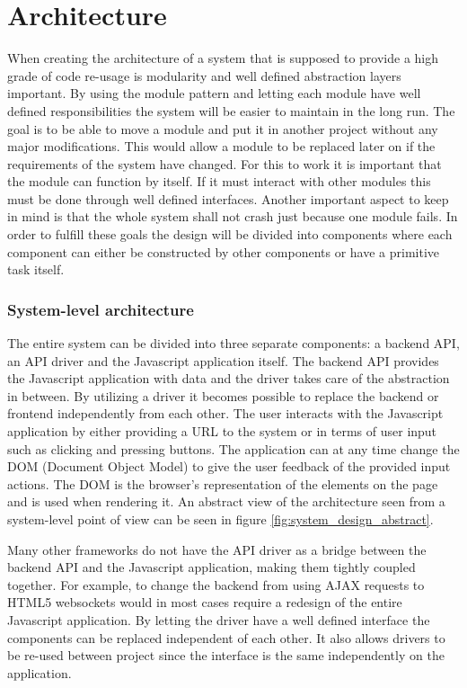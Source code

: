 \chapter{Architecture}

\setcounter{section}{4}
\setcounter{subsection}{0}

\label{sec:architecture}

When creating the architecture of a system that is supposed to provide a high grade of code re-usage is modularity and well defined abstraction layers important. By using the module pattern and letting each module have well defined responsibilities the system will be easier to maintain in the long run. The goal is to be able to move a module and put it in another project without any major modifications. This would allow a module to be replaced later on if the requirements of the system have changed. For this to work it is important that the module can function by itself. If it must interact with other modules this must be done through well defined interfaces. Another important aspect to keep in mind is that the whole system shall not crash just because one module fails. In order to fulfill these goals the design will be divided into components where each component can either be constructed by other components or have a primitive task itself. 

\subsection{System-level architecture}

The entire system can be divided into three separate components: a backend API, an API driver and the Javascript application itself. The backend API provides the Javascript application with data and the driver takes care of the abstraction in between. By utilizing a driver it becomes possible to replace the backend or frontend independently from each other. The user interacts with the Javascript application by either providing a URL to the system or in terms of user input such as clicking and pressing buttons. The application can at any time change the DOM (Document Object Model) to give the user feedback of the provided input actions. The DOM is the browser's representation of the elements on the page and is used when rendering it. An abstract view of the architecture seen from a system-level point of view can be seen in figure \ref{fig:system_design_abstract}.

Many other frameworks do not have the API driver as a bridge between the backend API and the Javascript application, making them tightly coupled together. For example, to change the backend from using AJAX requests to HTML5 websockets would in most cases require a redesign of the entire Javascript application. By letting the driver have a well defined interface the components can be replaced independent of each other. It also allows drivers to be re-used between project since the interface is the same independently on the application.

